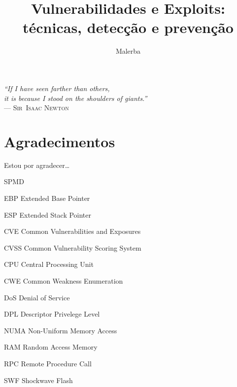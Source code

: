 \documentclass[t]{iiufrgs}
\title{Vulnerabilidades e Exploits: técnicas, detecção e prevenção}
\author{Malerba}{César}
\begin{document}
\maketitle

\clearpage
\begin{flushright}
\mbox{}\vfill
{\sffamily\itshape
``If I have seen farther than others,\\
it is because I stood on the shoulders of giants.''\\}
--- \textsc{Sir~Isaac Newton}
\end{flushright}

\chapter*{Agradecimentos}
Estou por agradecer\ldots

\tableofcontents

\begin{listofabbrv}{SPMD}
        \item[EBP] Extended Base Pointer
		\item[ESP] Extended Stack Pointer
		\item[CVE] Common Vulnerabilities and Exposures
		\item[CVSS] Common Vulnerability Scoring System
		\item[CPU] Central Processing Unit
		\item[CWE] Common Weakness Enumeration
		\item[DoS] Denial of Service
		\item[DPL] Descriptor Privelege Level
        \item[NUMA] Non-Uniform Memory Access
        \item[RAM] Random Access Memory
        \item[RPC] Remote Procedure Call
        \item[SWF] Shockwave Flash
\end{listofabbrv}

\end{document}

